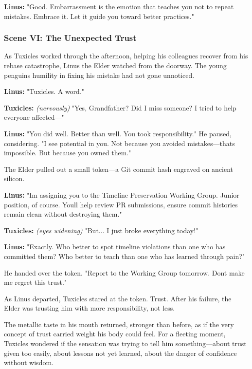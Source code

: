 \textbf{Linus:} "Good. Embarrassment is the emotion that teaches you not to repeat mistakes. Embrace it. Let it guide you toward better practices."

\bookdivider

\subsubsection{Scene VI: The Unexpected Trust}\label{scene-vi-the-unexpected-trust}

As Tuxicles worked through the afternoon, helping his colleagues recover from his rebase catastrophe, Linus the Elder watched from the doorway. The young penguin\textquotesingle s humility in fixing his mistake had not gone unnoticed.

\textbf{Linus:} "Tuxicles. A word."

\textbf{Tuxicles:} \emph{(nervously)} "Yes, Grandfather? Did I miss someone? I tried to help everyone affected---"

\textbf{Linus:} "You did well. Better than well. You took responsibility." He paused, considering. "I see potential in you. Not because you avoided mistakes---that\textquotesingle s impossible. But because you owned them."

The Elder pulled out a small token---a Git commit hash engraved on ancient silicon.

\textbf{Linus:} "I\textquotesingle m assigning you to the Timeline Preservation Working Group. Junior position, of course. You\textquotesingle ll help review PR submissions, ensure commit histories remain clean without destroying them."

\textbf{Tuxicles:} \emph{(eyes widening)} "But... I just broke everything today!"

\textbf{Linus:} "Exactly. Who better to spot timeline violations than one who has committed them? Who better to teach than one who has learned through pain?"

He handed over the token. "Report to the Working Group tomorrow. Don\textquotesingle t make me regret this trust."

As Linus departed, Tuxicles stared at the token. Trust. After his failure, the Elder was trusting him with more responsibility, not less.

The metallic taste in his mouth returned, stronger than before, as if the very concept of trust carried weight his body could feel. For a fleeting moment, Tuxicles wondered if the sensation was trying to tell him something---about trust given too easily, about lessons not yet learned, about the danger of confidence without wisdom.


